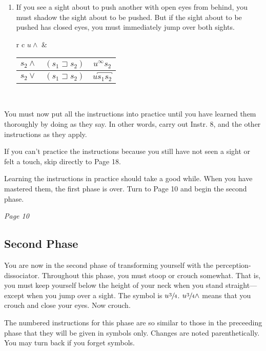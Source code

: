\begin{enumerate}
\item If you see a sight about to push another with open eyes from 
behind, you must shadow the sight about to be pushed. But if the sight 
about to be pushed has closed eyes, you must immediately jump over both 
sights. 

\begin{tabular}{ r c }
	$u\wedge$ & \begin{tabular}{ c c c }
		$s_2\wedge$ & $(s_1\sqsupset s_2)$ & $u^\infty s_2$ \\ \midrule
		$s_2\vee$ & $(s_1\sqsupset s_2)$ & $u\overbracket{s_1s_2}$ \\
	\end{tabular} \\
\end{tabular}
\end{enumerate}

You must now put all the instructions into practice until you have 
learned them thoroughly by doing as they say. In other words, carry out 
Instr. 8, and the other instructions as they apply. 

If you can't practice the instructions because you still have not seen a 
sight or felt a touch, skip directly to Page 18. 

Learning the instructions in practice should take a good while. When 
you have mastered them, the first phase is over. Turn to Page 10 and begin 
the second phase. 

\clearpage

{\centering \textit{Page 10} \par}

\subsection*{Second Phase}

You are now in the second phase of transforming yourself with the 
perception-dissociator. Throughout this phase, you must stoop or crouch 
somewhat. That is, you must keep yourself below the height of your neck 
when you stand straight---except when you jump over a sight. The symbol is 
$u\sfrac{3}{4}$. $u\sfrac{3}{4}\wedge$ means that you crouch and close your eyes. Now crouch. 

The numbered instructions for this phase are so similar to those in the 
preceeding phase that they will be given in symbols only. Changes are noted 
parenthetically. You may turn back if you forget symbols. 

